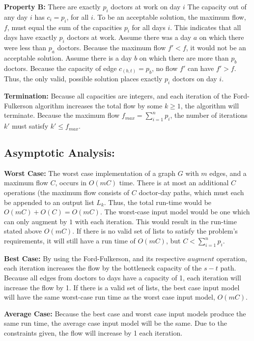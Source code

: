 \documentclass{article}
\begin{document}
\noindent \textbf{Property B:}  There are exactly $p_i$ doctors at work on day $i$ \newline
The capacity out of any day $i$ has $c_i = p_i$, for all $i$.  To be an acceptable solution, the maximum flow, $f$, must equal the sum of the capacities $p_i$ for all days $i$.  This indicates that all days have exactly $p_i$ doctors at work.  Assume there was a day $a$ on which there were less than $p_a$ doctors.  Because the maximum flow $f' < f$, it would not be an acceptable solution.  Assume there is a day $b$ on which there are more than $p_b$ doctors.  Because the capacity of edge $c_{(b, t)} = p_b$, no flow $f'$ can have $f' > f$.  Thus, the only valid, possible solution places exactly $p_i$ doctors on day $i$.

\noindent \textbf{Termination:}  Because all capacities are integers, and each iteration of the Ford-Fulkerson algorithm increases the total flow by some $k \geq 1$, the algorithm will terminate.  Because the maximum flow $f_{max}= \sum_{i=1}^n p_i$, the number of iterations $k'$ must satisfy $k' \leq f_{max}$.

\subsection*{Asymptotic Analysis:}
\noindent \textbf{Worst Case:}
The worst case implementation of a graph $G$ with $m$ edges, and a maximum flow $C$, occurs in $O(mC)$ time.  There is at most an additional $C$ operations (the maximum flow consists of $C$ doctor-day paths, which must each be appended to an output list $L_k$.  Thus, the total run-time would be $O(mC) + O(C) = O(mC)$.
The worst-case input model would be one which can only augment by $1$ with each iteration.  This would result in the run-time stated above $O(mC)$.  If there is no valid set of lists to satisfy the problem's requirements, it will still have a run time of $O(mC)$, but $C < \sum_{i = 1}^n p_i$.
 
\noindent \textbf{Best Case:}
By using the Ford-Fulkerson, and its respective $augment$ operation, each iteration increases the flow by the bottleneck capacity of the $s-t$ path.  Because all edges from doctors to days have a capacity of 1, each iteration will increase the flow by 1.  If there is a valid set of lists, the best case input model will have the same worst-case run time as the worst case input model, $O(mC)$.  
  
\noindent \textbf{Average Case:}
Because the best case and worst case input models produce the same run time, the average case input model will be the same.  Due to the constraints given, the flow will increase by 1 each iteration.
\end{document}
